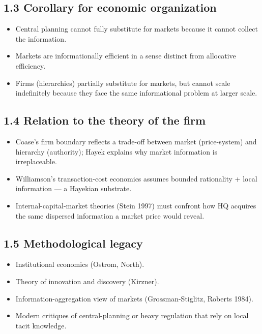 \documentclass[11pt]{article}
\begin{document}
\subsection*{1.3 Corollary for economic organization}
\begin{itemize}
\item Central planning cannot fully substitute for markets because it cannot collect the information.
\item Markets are informationally efficient in a sense distinct from allocative efficiency.
\item Firms (hierarchies) partially substitute for markets, but cannot scale indefinitely because they face the same informational problem at larger scale.
\end{itemize}

\subsection*{1.4 Relation to the theory of the firm}
\begin{itemize}
\item Coase's firm boundary reflects a trade-off between market (price-system) and hierarchy (authority); Hayek explains why market information is irreplaceable.
\item Williamson's transaction-cost economics assumes bounded rationality + local information --- a Hayekian substrate.
\item Internal-capital-market theories (Stein 1997) must confront how HQ acquires the same dispersed information a market price would reveal.
\end{itemize}

\subsection*{1.5 Methodological legacy}
\begin{itemize}
\item Institutional economics (Ostrom, North).
\item Theory of innovation and discovery (Kirzner).
\item Information-aggregation view of markets (Grossman-Stiglitz, Roberts 1984).
\item Modern critiques of central-planning or heavy regulation that rely on local tacit knowledge.
\end{itemize}
\end{document}
